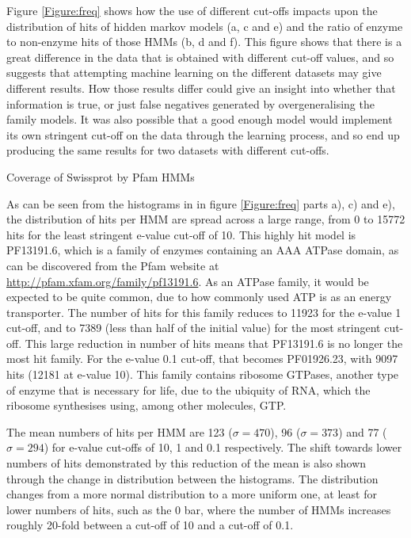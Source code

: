 \documentclass[12pt]{article}
\makeatletter
\renewcommand\paragraph{\@startsection{paragraph}{4}{\z@}
            {-2.5ex\@plus -1ex \@minus -.25ex}
            {1ex \@plus .25ex}
            {\normalfont\normalsize\bfseries}}
\makeatother
\begin{document}
			Figure \ref{Figure:freq} shows how the use of different cut-offs impacts upon the distribution of hits of hidden markov models (a, c and e) and the ratio of enzyme to non-enzyme hits of those HMMs (b, d and f).  This figure shows that there is a great difference in the data that is obtained with different cut-off values, and so suggests that attempting machine learning on the different datasets may give different results. How those results differ could give an insight into whether that information is true, or just false negatives generated by overgeneralising the family models.
			It was also possible that a good enough model would implement its own stringent cut-off on the data through the learning process, and so end up producing the same results for two datasets with different cut-offs.
			
			\paragraph{Coverage of Swissprot by Pfam HMMs}
			
			As can be seen from the histograms in in figure \ref{Figure:freq} parts a), c) and e), the distribution of hits per HMM are spread across a large range, from 0 to 15772 hits for the least stringent e-value cut-off of 10. This highly hit model is PF13191.6, which is a family of enzymes containing an AAA ATPase domain, as can be discovered from the Pfam website at \url{http://pfam.xfam.org/family/pf13191.6}. As an ATPase family, it would be expected to be quite common, due to how commonly used ATP is as an energy transporter.  The number of hits for this family reduces to 11923 for the e-value 1 cut-off, and to 7389 (less than half of the initial value) for the most stringent cut-off.  This large reduction in number of hits means that PF13191.6 is no longer the most hit family.  For the e-value 0.1 cut-off, that becomes PF01926.23, with 9097 hits (12181 at e-value 10).  This family contains ribosome GTPases, another type of enzyme that is necessary for life, due to the ubiquity of RNA, which the ribosome synthesises using, among other molecules, GTP.
			
			The mean numbers of hits per HMM are 123 ($\sigma = 470$), 96 ($\sigma = 373$) and 77 ($\sigma = 294$) for e-value cut-offs of 10, 1 and 0.1 respectively.  The shift towards lower numbers of hits demonstrated by this reduction of the mean is also shown through the change in distribution between the histograms. The distribution changes from a more normal distribution to a more uniform one, at least for lower numbers of hits, such as the 0 bar, where the number of HMMs increases roughly 20-fold between a cut-off of 10 and a cut-off of 0.1.  
			
\end{document}
